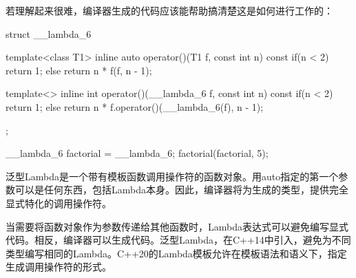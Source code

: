 若理解起来很难，编译器生成的代码应该能帮助搞清楚这是如何进行工作的：

\begin{cpp}
struct __lambda_6
{
	template<class T1>
	inline auto operator()(T1 f, const int n) const
	{
		if(n < 2) return 1;
		else return n * f(f, n - 1);
	}

	template<>
	inline int operator()(__lambda_6 f, const int n) const
	{
		if(n < 2) return 1;
		else return n * f.operator()(__lambda_6(f), n - 1);
	}
};

__lambda_6 factorial = __lambda_6{};
factorial(factorial, 5);
\end{cpp}

泛型Lambda是一个带有模板函数调用操作符的函数对象。用auto指定的第一个参数可以是任何东西，包括Lambda本身。因此，编译器将为生成的类型，提供完全显式特化的调用操作符。

当需要将函数对象作为参数传递给其他函数时，Lambda表达式可以避免编写显式代码。相反，编译器可以生成代码。泛型Lambda，在C++14中引入，避免为不同类型编写相同的Lambda。C++20的Lambda模板允许在模板语法和语义下，指定生成调用操作符的形式。


